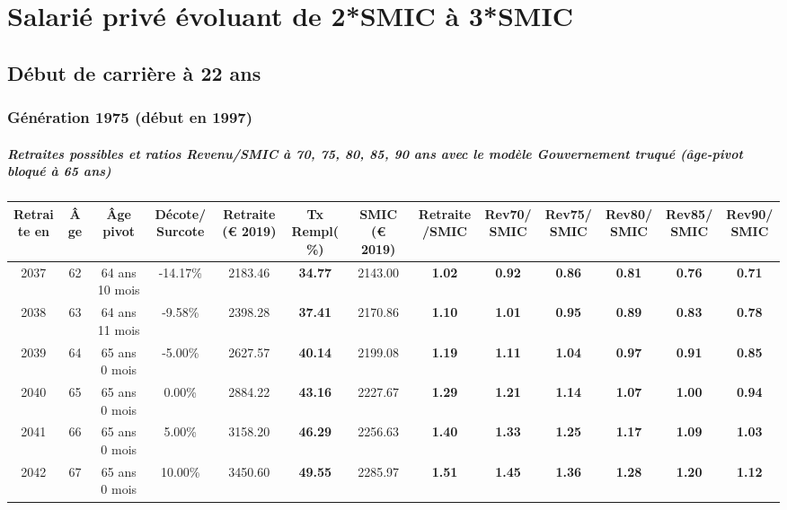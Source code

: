 \newpage 
 
\chapter{Salarié privé évoluant de 2*SMIC à 3*SMIC} 


 \addto{\captionsenglish}{ \renewcommand{\mtctitle}{}} \setcounter{minitocdepth}{2} 
 \minitoc \newpage 

\section{Début de carrière à 22 ans} 

\subsection{Génération 1975 (début en 1997)} 

\paragraph{Retraites possibles et ratios Revenu/SMIC à 70, 75, 80, 85, 90 ans avec le modèle \emph{Gouvernement truqué (âge-pivot bloqué à 65 ans)}}  
 
{ \scriptsize \begin{center} 
\begin{tabular}[htb]{|c|c||c|c||c|c||c||c|c|c|c|c|c|} 
\hline 
 Retraite en &  Âge &  Âge pivot &  Décote/Surcote &  Retraite (\euro{} 2019) &  Tx Rempl(\%) &  SMIC (\euro{} 2019) &  Retraite/SMIC &  Rev70/SMIC &  Rev75/SMIC &  Rev80/SMIC &  Rev85/SMIC &  Rev90/SMIC \\ 
\hline \hline 
 2037 &  62 &  64 ans 10 mois &  -14.17\% &  2183.46 &  {\bf 34.77} &  2143.00 &  {\bf 1.02} &  {\bf {\color{red} 0.92}} &  {\bf {\color{red} 0.86}} &  {\bf {\color{red} 0.81}} &  {\bf {\color{red} 0.76}} &  {\bf {\color{red} 0.71}} \\ 
\hline 
 2038 &  63 &  64 ans 11 mois &  -9.58\% &  2398.28 &  {\bf 37.41} &  2170.86 &  {\bf 1.10} &  {\bf 1.01} &  {\bf {\color{red} 0.95}} &  {\bf {\color{red} 0.89}} &  {\bf {\color{red} 0.83}} &  {\bf {\color{red} 0.78}} \\ 
\hline 
 2039 &  64 &  65 ans 0 mois &  -5.00\% &  2627.57 &  {\bf 40.14} &  2199.08 &  {\bf 1.19} &  {\bf 1.11} &  {\bf 1.04} &  {\bf {\color{red} 0.97}} &  {\bf {\color{red} 0.91}} &  {\bf {\color{red} 0.85}} \\ 
\hline 
 2040 &  65 &  65 ans 0 mois &  0.00\% &  2884.22 &  {\bf 43.16} &  2227.67 &  {\bf 1.29} &  {\bf 1.21} &  {\bf 1.14} &  {\bf 1.07} &  {\bf {\color{red} 1.00}} &  {\bf {\color{red} 0.94}} \\ 
\hline 
 2041 &  66 &  65 ans 0 mois &  5.00\% &  3158.20 &  {\bf 46.29} &  2256.63 &  {\bf 1.40} &  {\bf 1.33} &  {\bf 1.25} &  {\bf 1.17} &  {\bf 1.09} &  {\bf 1.03} \\ 
\hline 
 2042 &  67 &  65 ans 0 mois &  10.00\% &  3450.60 &  {\bf 49.55} &  2285.97 &  {\bf 1.51} &  {\bf 1.45} &  {\bf 1.36} &  {\bf 1.28} &  {\bf 1.20} &  {\bf 1.12} \\ 
\hline 
\hline 
\end{tabular} 
\end{center} } 
